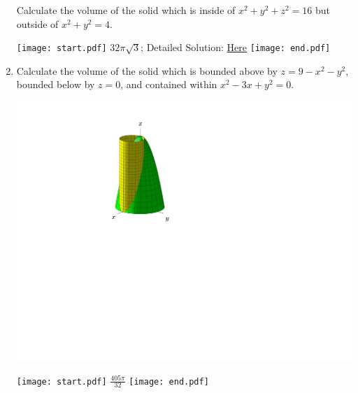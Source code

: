 \documentclass[12pt]{article}
\begin{document}
\begin{enumerate}
Calculate the volume of the solid which is inside of $x^2+y^2+z^2=16$ but outside of $x^2+y^2=4$.

\texttt{[image: start.pdf]}
{{$32\pi\sqrt{3}$; Detailed Solution: \textcolor{blue}{\href{http://www.math.drexel.edu/classes/Calculus/resources/Math200HW/Solutions/18_200_DI_Polar_10.pdf}{Here}}}}
\texttt{[image: end.pdf]}


\newpage

\item Calculate the volume of the solid which is bounded above by $z=9-x^2-y^2$, bounded below by $z=0$, and contained within $x^2-3x+y^2=0$.

\begin{center}
\includegraphics[scale=0.7]{region2.pdf}
\end{center}

\texttt{[image: start.pdf]}
{{$\frac{405\pi}{32}$}}
\texttt{[image: end.pdf]}


\end{enumerate}
\end{document}
